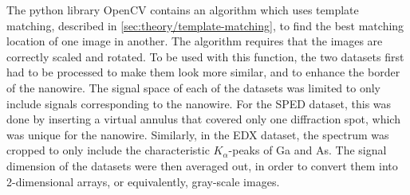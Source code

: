 %


The python library OpenCV contains an algorithm which uses template matching, described in \cref{sec:theory/template-matching}, to find the best matching location of one image in another. The algorithm requires that the images are correctly scaled and rotated. To be used with this function, the two datasets first had to be processed to make them look more similar, and to enhance the border of the nanowire. The signal space of each of the datasets was limited to only include signals corresponding to the nanowire. For the SPED dataset, this was done by inserting a virtual annulus that covered only one diffraction spot, which was unique for the nanowire. Similarly, in the EDX dataset, the spectrum was cropped to only include the characteristic $K_\alpha$-peaks of Ga and As. The signal dimension of the datasets were then averaged out, in order to convert them into 2-dimensional arrays, or equivalently, gray-scale images.

